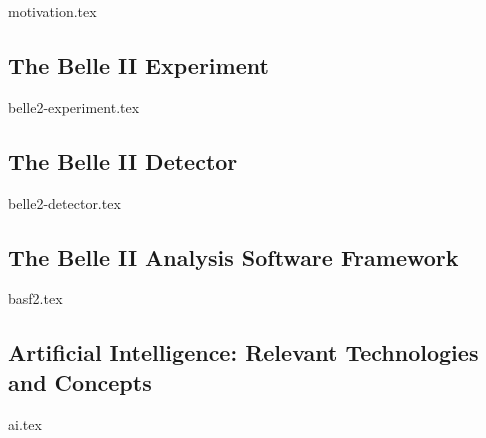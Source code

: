 {motivation.tex}

\def\sectitle{The Belle II Experiment}
\subsection%
[\sectitle]%
{\sectitle{} \cite{b2-physics-book}}
{belle2-experiment.tex}

\def\sectitle{The Belle II Detector}
\subsection%
[\sectitle]%
{\sectitle{} \cite{b2-physics-book}\cite{belle2-tdr}}
{belle2-detector.tex}

\def\sectitle{The Belle II Analysis Software Framework}
\subsection%
[\sectitle]%
{\sectitle{}
\cite{basf2-paper}%
\cite{basf2-online-book-sphinx}%
\cite{basf2-doxygen}%
}\label{sec:basf2}
{basf2.tex}

\subsection{Artificial Intelligence: Relevant Technologies and Concepts}
{ai.tex}

